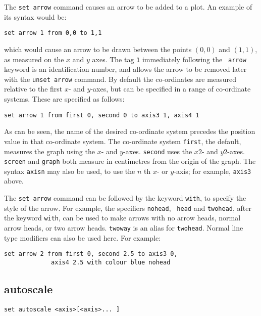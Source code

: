 The {\tt set arrow} command causes an arrow to be added to a plot. An example of
its syntax would be:

\begin{verbatim}
set arrow 1 from 0,0 to 1,1
\end{verbatim}

\noindent which would cause an arrow to be drawn between the points $(0,0)$ and $(1,1)$, as
measured on the $x$ and $y$ axes.  The tag {\tt 1} immediately following the {\tt
arrow} keyword is an identification number, and allows the arrow to be removed
later with the {\tt unset arrow} command.  By default the co-ordinates are
measured relative to the first $x$- and $y$-axes, but can be specified in a range
of co-ordinate systems. These are specified as follows:

\begin{verbatim}
set arrow 1 from first 0, second 0 to axis3 1, axis4 1
\end{verbatim}

As can be seen, the name of the desired co-ordinate system precedes the position
value in that co-ordinate system. The co-ordinate system {\tt first}, the default,
measures the graph using the $x$- and $y$-axes. {\tt second} uses the $x2$- and
$y2$-axes.  {\tt screen} and {\tt graph} both measure in centimetres from the
origin of the graph.  The syntax {\tt axisn} may also be
used, to use the $n$ th $x$- or $y$-axis; for example, {\tt axis3} above.

The {\tt set arrow} command can be followed by the keyword {\tt with}, to
specify the style of the arrow. For example, the specifiers {\tt nohead}, {\tt
head} and {\tt twohead}, after the keyword {\tt with}, can be used to make
arrows with no arrow heads, normal arrow heads, or two arrow heads. {\tt twoway}
is an alias for {\tt twohead}.  Normal line type modifiers can also be used
here.  For example:

\begin{verbatim}
set arrow 2 from first 0, second 2.5 to axis3 0,
             axis4 2.5 with colour blue nohead
\end{verbatim}



\subsection{autoscale}

\begin{verbatim}
set autoscale <axis>[<axis>... ] 
\end{verbatim}

